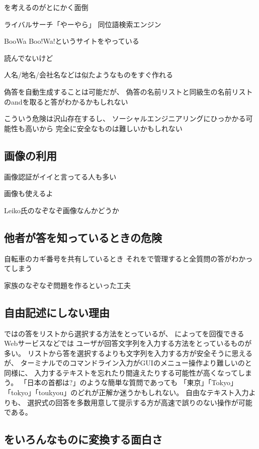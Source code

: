 \documentclass[twoside]{wiss}
\begin{document}
{\SQ}を考えるのがとにかく面倒

ライバルサーチ「やーやら」
同位語検索エンジン\cite{大島裕明:2006-12-15}

BooWa
\cite{Wang:2007:LSE:1441428.1442086}
Boo!Wa!というサイトをやっている\cite{BooWa}

\cite{Huang:2012:LFC:2426725.2426728}読んでないけど

人名/地名/会社名などは似たようなものをすぐ作れる

偽答を自動生成することは可能だが、
偽答の名前リストと同級生の名前リストのandを取ると答がわかるかもしれない

こういう危険は沢山存在するし、
ソーシャルエンジニアリング\cite{ソーシャル}にひっかかる可能性も高いから
完全に安全なものは難しいかもしれない


\subsection{画像の利用}

画像認証がイイと言ってる人も多い

画像も使えるよ

Leiko氏のなぞなぞ画像なんかどうか

\subsection{他者が答を知っているときの危険}

自転車のカギ番号を共有しているとき
それを{\EP}で管理すると全質問の答がわかってしまう

家族のなぞなぞ問題を作るといった工夫

\subsection{自由記述にしない理由}

{\EP}では{\SQ}の答をリストから選択する方法をとっているが、
{\SQ}によって{\PW}を回復できるWebサービスなどでは
ユーザが回答文字列を入力する方法をとっているものが多い。
リストから答を選択するよりも文字列を入力する方が安全そうに思えるが、
ターミナルでのコマンドライン入力がGUIのメニュー操作より難しいのと同様に、
入力するテキストを忘れたり間違えたりする可能性が高くなってしまう。
「日本の首都は?」のような簡単な質問であっても
「東京」「Tokyo」「tokyo」「toukyou」のどれが正解か迷うかもしれない。
自由なテキスト入力よりも、
選択式の回答を多数用意して提示する方が高速で誤りのない操作が可能である。


\subsection{{\EM}をいろんなものに変換する面白さ}
\end{document}
